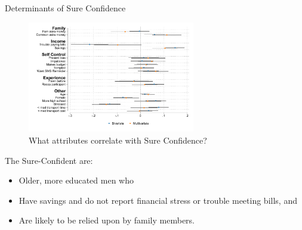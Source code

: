 \documentclass[8pt]{beamer}
\begin{document}
\begin{frame}{Determinants of Sure Confidence}
    
        \begin{figure}
        \caption{What attributes correlate with Sure Confidence?}
        \centering
        \includegraphics[width=0.65\textwidth]{Figuras/determinants_confidence_100.pdf}
        \end{figure}

The Sure-Confident are:
\begin{itemize}
    \item   Older, more educated men who
    \item   Have savings and do not report financial stress or trouble meeting bills, and 
    \item   Are likely to be relied upon by family members.
\end{itemize}        


\end{frame}
\end{document}
